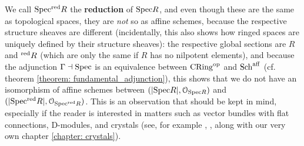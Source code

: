 \begin{example}
                    We call $\mathrm{Spec} {}^{\mathrm{red}}R$ the \textbf{reduction} of $\mathrm{Spec} R$, and even though these are the same as topological spaces, they are \textit{not} so as affine schemes, because the respective structure sheaves are different (incidentally, this also shows how ringed spaces are uniquely defined by their structure sheaves): the respective global sections are $R$ and ${}^{\mathrm{red}}R$ (which are only the same if $R$ has no nilpotent elements), and because the adjunction $\Gamma \dashv \mathrm{Spec}$ is an equivalence between $\mathrm{CRing}^{\mathrm{op}}$ and $\mathrm{Sch}^{\mathrm{aff}}$ (cf. theorem \ref{theorem: fundamental_adjunction}), this shows that we do not have an isomorphism of affine schemes between $(|\mathrm{Spec} R|, \mathcal{O}_{\mathrm{Spec} R})$ and $(|\mathrm{Spec} {}^{\mathrm{red}}R|, \mathcal{O}_{\mathrm{Spec} {}^{\mathrm{red}}R})$. This is an observation that should be kept in mind, especially if the reader is interested in matters such as vector bundles with flat connections, D-modules, and crystals (see, for example \cite{lurie_crystals}, \cite{GR_crystals}, along with our very own chapter \ref{chapter: crystals}).
                \end{example}
                

